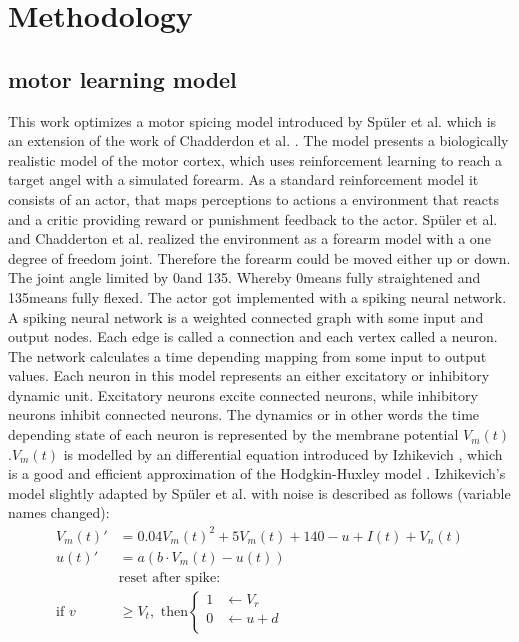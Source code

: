 \chapter{Methodology}\label{Methodology}
\section{motor learning model}
This work optimizes a motor spicing model introduced by Spüler et al. \cite{sebastianPaper} which is an extension of the work of Chadderdon et al. \cite{chadderdonNeuronalModel}. The model presents a biologically realistic model of the motor cortex, which uses reinforcement learning to reach a target angel with a simulated forearm.
As a standard reinforcement model \cite{reinforcementlearning}\cite{chadderdonNeuronalModel} it consists of an actor, that maps perceptions to actions a environment that reacts and a critic providing reward or punishment feedback to the actor. Spüler et al. and Chadderton et al. realized the environment as a forearm model with a one degree of freedom joint. Therefore the forearm could be moved either up or down. The joint angle limited by 0\degree and 135\degree. Whereby 0\degree means fully straightened and 135\degree means fully flexed. The actor got implemented with a spiking neural network. A spiking neural network is a weighted connected graph with some input and output nodes. Each edge is called a connection and each vertex called a neuron. The network calculates a time depending mapping from some input to output values. %
Each neuron in this model represents an either excitatory or inhibitory dynamic unit. Excitatory neurons excite connected neurons, while inhibitory neurons inhibit connected neurons.
The dynamics or in other words the time depending state of each neuron is represented by the membrane potential $V_m(t)$.$V_m(t)$ is modelled by an differential equation introduced by Izhikevich \cite{izhikevichSimpleModel}, which is a good and efficient approximation of the Hodgkin-Huxley model \cite{hodgkinHuxleyModel}. Izhikevich's model slightly adapted by Spüler et al. with noise is described as follows (variable names changed):
\begin{align*}
	V_m(t)' &= 0.04 V_m(t)^2+5V_m(t)+140-u+I(t)+V_n(t)\\
	u(t)' &= a(b\cdot V_m(t)-u(t))\\
	&\text{reset after spike:}\\
	\text{if } v&\geq V_t,\text{ then}
	\begin{cases}
	1 & \leftarrow V_r\\
	0 & \leftarrow u+d\\
	\end{cases} 
\end{align*}
